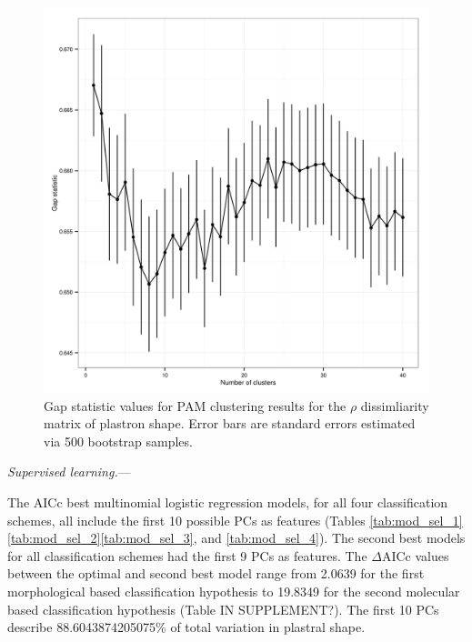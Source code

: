 \documentclass[12pt,letterpaper]{article}\usepackage{graphicx, color}
\renewcommand{\subsubsection}[1]{%
\vspace{2ex}
\noindent
\textit{#1.}---}
\begin{document}
\begin{figure}[ht]
  \centering
  \includegraphics[width = \textwidth]{figure/gap_res}
  \caption{Gap statistic values for PAM clustering results for the \(\rho\) dissimliarity matrix of plastron shape. Error bars are standard errors estimated via 500 bootstrap samples.}
  \label{fig:gap}
\end{figure}

\subsubsection{Supervised learning}


The AICc best multinomial logistic regression models, for all four classification schemes, all include the first 10 possible PCs as features (Tables \ref{tab:mod_sel_1}\ref{tab:mod_sel_2}\ref{tab:mod_sel_3}, and \ref{tab:mod_sel_4}). The second best models for all classification schemes had the first 9 PCs as features. The \(\Delta\)AICc values between the optimal and second best model range from 2.0639 for the first morphological based classification hypothesis to 19.8349 for the second molecular based classification hypothesis (Table IN SUPPLEMENT?). The first 10 PCs describe 88.6043874205075\% of total variation in plastral shape.
\end{document}
